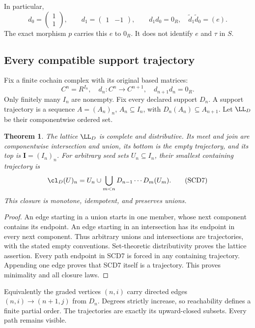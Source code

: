 \documentclass[11pt,a4paper]{article}
\newtheorem{theorem}{Theorem}[section]
\theoremstyle{definition}\newtheorem{definition}[theorem]{Definition}
\begin{document}
In particular,
\[
 d_0=\begin{pmatrix}1\\1\end{pmatrix},\qquad
 d_1=\begin{pmatrix}1&-1\end{pmatrix},
 \qquad d_1d_0=0_R,\quad \widetilde d_1\widetilde d_0=(e).
 \tag{SCD5}
\]
The exact morphism \(p\) carries this \(e\) to \(0_R\).
It does not identify \(e\) and \(\tau\) in \(S\).

\subsection{Every compatible support trajectory}

Fix a finite cochain complex with its original based matrices:
\[
 C^n=R^{I_n},\quad d_n:C^n\to C^{n+1},\quad
 d_{n+1}d_n=0_R.
 \tag{SCD6}
\]
Only finitely many \(I_n\) are nonempty. Fix every declared support \(D_n\).
A support trajectory is a sequence \(A=(A_n)_n\), \(A_n\subseteq I_n\),
with \(D_n(A_n)\subseteq A_{n+1}\). Let \(\LL_D\) be their componentwise
ordered set.

\begin{theorem}
The lattice \(\LL_D\) is complete and distributive. Its meet and join
are componentwise intersection and union, its bottom is the empty
trajectory, and its top is \(\mathbf I=(I_n)_n\).
For arbitrary seed sets \(U_n\subseteq I_n\), their smallest containing
trajectory is
\[
 \cl_D(U)_n=U_n\cup
 \bigcup_{m<n}D_{n-1}\cdots D_m(U_m).
 \tag{SCD7}
\]
This closure is monotone, idempotent, and preserves unions.
\end{theorem}
\begin{proof}
An edge starting in a union starts in one member, whose next component
contains its endpoint. An edge starting in an intersection has its
endpoint in every next component. Thus arbitrary unions and intersections
are trajectories, with the stated empty conventions. Set-theoretic
distributivity proves the lattice assertion. Every path endpoint in SCD7
is forced in any containing trajectory. Appending one edge proves that
SCD7 itself is a trajectory. This proves minimality and all closure laws.
\end{proof}

Equivalently the graded vertices \((n,i)\) carry directed edges
\((n,i)\to(n+1,j)\) from \(D_n\). Degrees strictly increase, so
reachability defines a finite partial order. The trajectories are
exactly its upward-closed subsets. Every path remains visible.
\end{document}
